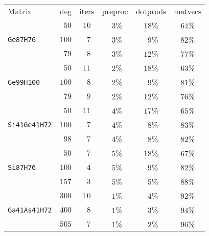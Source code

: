 \begin{tabular}{l|c|c|c|c|c}
\hline
\multirow{2}{*}{Matrix} & \multirow{2}{*}{deg} & \multirow{2}{*}{iters} & \multirow{2}{*}{preproc} & \multirow{2}{*}{dotprods} & \multirow{2}{*}{matvecs} \\
 & & & & & \\\hline
\hline
  & $\phantom{0}50$ & $10$ & $\phantom{0}3$\% & $18$\% & $64$\%\\
\verb|Ge87H76| & $100$ & $\phantom{0}7$ & $\phantom{0}3$\% & $\phantom{0}9$\% & $82$\%\\
  & $\phantom{0}79$ & $\phantom{0}8$ & $\phantom{0}3$\% & $12$\% & $77$\%\\\hline
  & $\phantom{0}50$ & $11$ & $\phantom{0}2$\% & $18$\% & $63$\%\\
\verb|Ge99H100| & $100$ & $\phantom{0}8$ & $\phantom{0}2$\% & $\phantom{0}9$\% & $81$\%\\
  & $\phantom{0}79$ & $\phantom{0}9$ & $\phantom{0}2$\% & $12$\% & $76$\%\\\hline
  & $\phantom{0}50$ & $11$ & $\phantom{0}4$\% & $17$\% & $65$\%\\
\verb|Si41Ge41H72| & $100$ & $\phantom{0}7$ & $\phantom{0}4$\% & $\phantom{0}8$\% & $83$\%\\
  & $\phantom{0}98$ & $\phantom{0}7$ & $\phantom{0}4$\% & $\phantom{0}8$\% & $82$\%\\\hline
  & $\phantom{0}50$ & $\phantom{0}7$ & $\phantom{0}5$\% & $18$\% & $67$\%\\
\verb|Si87H76| & $100$ & $\phantom{0}4$ & $\phantom{0}5$\% & $\phantom{0}9$\% & $82$\%\\
  & $157$ & $\phantom{0}3$ & $\phantom{0}5$\% & $\phantom{0}5$\% & $88$\%\\\hline
  & $300$ & $10$ & $\phantom{0}1$\% & $\phantom{0}4$\% & $92$\%\\
\verb|Ga41As41H72| & $400$ & $\phantom{0}8$ & $\phantom{0}1$\% & $\phantom{0}3$\% & $94$\%\\
  & $505$ & $\phantom{0}7$ & $\phantom{0}1$\% & $\phantom{0}2$\% & $96$\%\\\hline
\end{tabular}